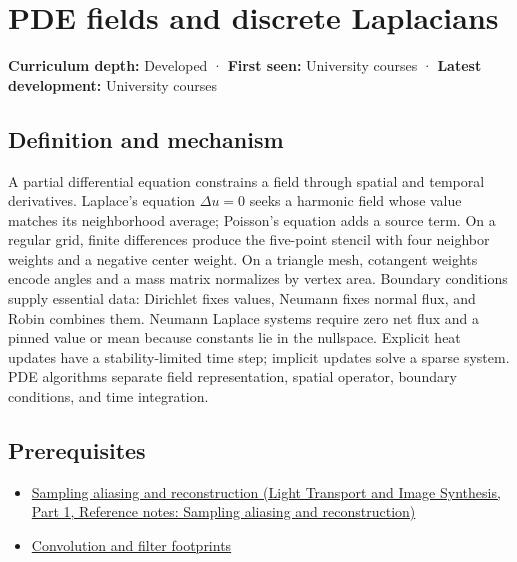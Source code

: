 \hypertarget{appendix-1988d465c119}{}\label{referencestart:appendix-1988d465c119}
\section{PDE fields and discrete Laplacians}\label{appendix-1988d465c119-pde-fields-and-discrete-laplacians}

\hypertarget{appendix-1988d465c119-pde-fields-and-discrete-laplacians}{}

\textbf{Curriculum depth:} Developed · \textbf{First seen:} University courses · \textbf{Latest development:} University courses

\begin{allmightroledefinition}

\subsection{Definition and mechanism}\label{appendix-1988d465c119-definition-and-mechanism}

\hypertarget{appendix-1988d465c119-definition-and-mechanism}{}

A partial differential equation constrains a field through spatial and temporal derivatives. Laplace's equation \(\Delta u=0\) seeks a harmonic field whose value matches its neighborhood average; Poisson's equation adds a source term. On a regular grid, finite differences produce the five-point stencil with four neighbor weights and a negative center weight. On a triangle mesh, cotangent weights encode angles and a mass matrix normalizes by vertex area. Boundary conditions supply essential data: Dirichlet fixes values, Neumann fixes normal flux, and Robin combines them. Neumann Laplace systems require zero net flux and a pinned value or mean because constants lie in the nullspace. Explicit heat updates have a stability-limited time step; implicit updates solve a sparse system. PDE algorithms separate field representation, spatial operator, boundary conditions, and time integration.

\end{allmightroledefinition}

\subsection{Prerequisites}\label{appendix-1988d465c119-prerequisites}

\hypertarget{appendix-1988d465c119-prerequisites}{}

\begin{itemize}
\tightlist
\item
  \href{../04-Light-Transport-and-Image-Synthesis-P01/main.pdf\#nameddest=appendix-6a7869dd79a6}{Sampling aliasing and reconstruction (Light Transport and Image Synthesis, Part 1, Reference notes: Sampling aliasing and reconstruction)}
\item
  \hyperref[appendix-d5b3c692d9f0]{Convolution and filter footprints}
\end{itemize}

